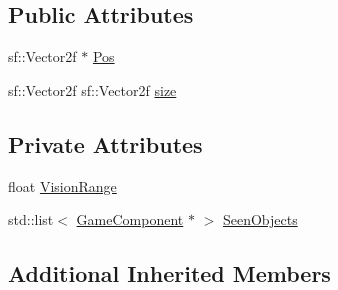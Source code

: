 \subsection*{Public Attributes}
\begin{DoxyCompactItemize}
\item 
sf\-::\-Vector2f $\ast$ \hyperlink{class_sensor_ab3b919642b59b2245ad3cf56b042ff33}{Pos}
\item 
sf\-::\-Vector2f sf\-::\-Vector2f \hyperlink{class_sensor_ac3268b4c0c8cee967256a622dfc5517d}{size}
\end{DoxyCompactItemize}
\subsection*{Private Attributes}
\begin{DoxyCompactItemize}
\item 
float \hyperlink{class_sensor_af509a7308626a219e017f07c0d25a78f}{Vision\-Range}
\item 
std\-::list$<$ \hyperlink{class_game_component}{Game\-Component} $\ast$ $>$ \hyperlink{class_sensor_a3ed58c2bc9140a884ce86014fbfd6926}{Seen\-Objects}
\end{DoxyCompactItemize}
\subsection*{Additional Inherited Members}


